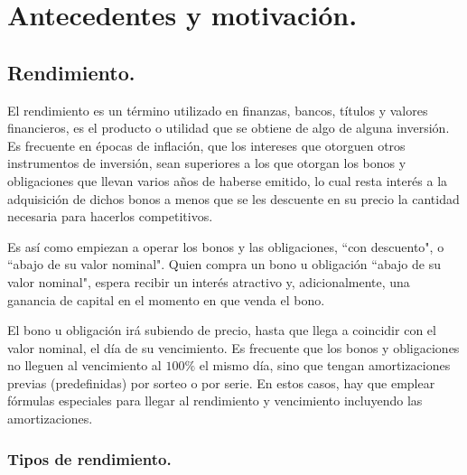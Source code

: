 \chapter{Antecedentes y motivaci\'on.}


\section{Rendimiento.}

\hspace*{0.4 cm} El rendimiento es un t\'ermino utilizado en finanzas, bancos, t\'itulos y valores financieros, es el producto o utilidad que se obtiene de algo  de alguna inversi\'on. Es frecuente en \'epocas de inflaci\'on, que los intereses que otorguen otros instrumentos de inversi\'on, sean superiores a los que otorgan los bonos y obligaciones que llevan varios a\~nos de haberse emitido, lo cual resta inter\'es a la adquisici\'on de dichos bonos a menos que se les descuente en su precio la cantidad necesaria para hacerlos competitivos.

\hspace*{0.4 cm}Es as\'i como empiezan a operar los bonos y las obligaciones, ``con descuento", o ``abajo de su valor nominal". Quien compra un bono u obligaci\'on ``abajo de su valor nominal", espera recibir un inter\'es atractivo y, adicionalmente, una ganancia de capital en el momento en que venda el bono.

\hspace*{0.4 cm}El bono u obligaci\'on ir\'a subiendo de precio, hasta que llega a coincidir con el valor nominal, el d\'ia de su vencimiento. Es frecuente que los bonos y obligaciones no lleguen al vencimiento al $100\%$ el mismo d\'ia, sino que tengan amortizaciones previas (predefinidas) por sorteo o por serie. En estos casos, hay que emplear f\'ormulas especiales para llegar al rendimiento y vencimiento incluyendo las amortizaciones.

\subsection{Tipos de rendimiento.\\}

